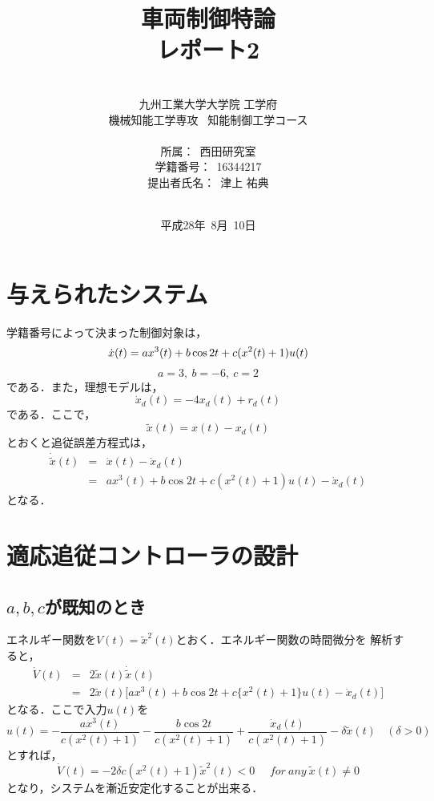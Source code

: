 \documentclass[a4paper,12pt]{jarticle}
\title{車両制御特論 \\
レポート2\\
}
\author{\vspace{40mm}\\
九州工業大学大学院 \hspace{0mm} 工学府\\
機械知能工学専攻\ \hspace{0mm} 知能制御工学コース \\
\vspace{5mm}\\
所属：\ 西田研究室\\
学籍番号：\ 16344217\\
提出者氏名：\ 津上 \hspace{0mm} 祐典\\\vspace{5mm}\\ }
\date{平成28年\ 8月\ 10日}
\begin{document}
\titlepage
\maketitle
\thispagestyle{empty}

\newpage
\section{与えられたシステム}
学籍番号によって決まった制御対象は，
\begin{equation}
 \dot{x}(t) = ax^3(t) + b \cos 2t + c(x^2(t)+1)u(t) \\
\end{equation}
%
\begin{equation}
 a = 3 ,\ b = -6 , \ c = 2 
\end{equation}
%
である．また，理想モデルは，
\begin{equation}\label{equ:ideal_model}
 \dot{x}_d(t) = -4x_d(t)+r_d(t)
\end{equation}
である．ここで，
\begin{equation}
 \tilde{x}(t) = x(t) - x_d(t) 
\end{equation}
とおくと追従誤差方程式は，
\begin{eqnarray}
 \dot{\tilde{x}}(t) & = & \dot{x}(t) - \dot{x}_d(t) \\
 & = & ax^3(t) + b \cos 2t + c(x^2(t)+1)u(t) - \dot{x}_d(t)
\end{eqnarray}
となる．
%
\section{適応追従コントローラの設計}

\subsection{$a,b,c$が既知のとき}
エネルギー関数を$V(t)=\tilde{x}^2(t)$とおく．エネルギー関数の時間微分を
解析すると，
%
\begin{eqnarray}
 \dot{V}(t) & = & 2\tilde{x}(t)\dot{\tilde{x}}(t) \\ 
  & = & 2\tilde{x}(t) \biggl[ax^3(t) + b \cos 2t+c\bigl\{x^2(t)+1 \bigr\}u(t)-\dot{x}_d(t)\biggr] 
\end{eqnarray}
%
となる．ここで入力$u(t)$を
\begin{equation}
 u(t) = -\frac{ax^3(t)}{c(x^2(t)+1)} -\frac{b \cos 2t}{c(x^2(t)+1)}
  +\frac{\dot{x}_d(t)}{c(x^2(t)+1)} - \delta \tilde{x}(t) \ \ \ \ (\delta > 0)
\end{equation}
%
とすれば，
%
\begin{equation}
 \dot{V}(t) = -2\delta c (x^2(t)+1)\tilde{x}^2(t) < 0 \ \ \ \ \ \ for \ any \ \tilde{x}(t)\neq 0
\end{equation}
となり，システムを漸近安定化することが出来る．
\end{document}
